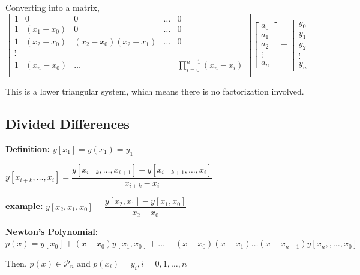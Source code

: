 \documentclass{article}
\begin{document}
\begin{enumerate}
    Converting into a matrix, 
    $\begin{bmatrix}
    1 & 0 & 0 & \dots & 0\\
    1 & (x_1 - x_0) & 0 & \dots & 0\\
    1 & (x_2 - x_0) & (x_2 - x_0)(x_2 - x_1) & \dots & 0\\
    \vdots & & & & \\
    1 & (x_n - x_0)   & \dots & & \displaystyle \prod_{i = 0}^{n - 1} (x_n - x_i) \\ 
    \end{bmatrix}\begin{bmatrix}
    a_0\\
    a_1\\
    a_2\\
    \vdots\\
    a_n
    \end{bmatrix} = \begin{bmatrix}
    y_0\\
    y_1\\
    y_2\\
    \vdots\\
    y_n
    \end{bmatrix}$
        
    This is a lower triangular system, which means there is no factorization involved.
\end{enumerate}


\pagebreak

\text{}

\subsection{Divided Differences}

\textbf{Definition:} $y[x_1] = y(x_1) = y_1$

$y[x_{i + k}, \dots , x_i] = \dfrac{y[x_{i + k}, \dots , x_{i + 1}] - y[x_{i + k + 1} , \dots , x_i]}{x_{i + k} - x_i}$ 

\vspace{0.2cm}

\textbf{example:} $y[x_2, x_1, x_0] = \dfrac{y[x_2, x_1] - y[x_1, x_0]}{x_2 - x_0}$

\vspace{0.2cm}

\textbf{Newton's Polynomial}: $p(x) = y[x_0] + (x - x_0) y[x_1, x_0] + \dots + (x - x_0) (x - x_1) \dots (x - x_{n - 1}) y[x_n, ,\dots ,x_0] $

Then, $p(x) \in \mathcal{P}_n$ and $p(x_i) = y_i, i = 0, 1, \dots ,n$
\end{document}
